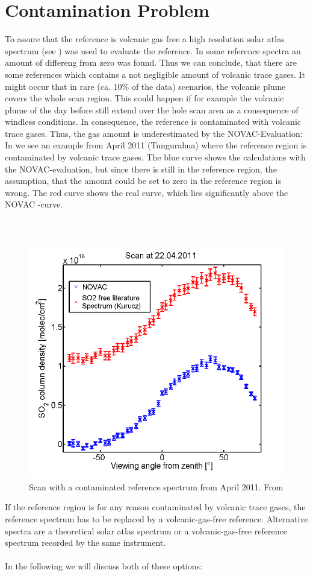 \section{Contamination Problem\label{Chap:Cont}}
To assure that the reference is volcanic gas free a high resolution solar atlas spectrum (see \label{kuruz}) was used to evaluate the reference. In some reference spectra an amount of   differeng from zero was found. Thus we can conclude, that there are some references which contains a not negligible amount of volcanic trace gases.
It might occur that in rare (ca. 10\% of the data) scenarios, the
volcanic plume covers the whole scan region.
This could happen if for example the volcanic plume of the day before still extend over the hole scan area as a consequence of windless conditions.
In consequence, the reference	is contaminated with volcanic trace gases. Thus, the gas amount is underestimated by the NOVAC-Evaluation: In  we see an example from April 2011 (Tungurahua) where the reference region is contaminated by volcanic trace gases. The blue  curve shows the calculations with the NOVAC-evaluation, but since there is still  in the reference region, the assumption, that the  amount could be set to zero in the reference region is wrong. The red curve shows the real  curve, which lies significantly above the NOVAC -curve.\\
\\	
%
\\
\begin{figure}
	\centering
	\includegraphics[width=0.7\linewidth]{Bilder/contaminated}
	\caption{Scan with a contaminated reference spectrum from April 2011. From \cite{WarnachSimon}}
	\label{fig:contaminated}
\end{figure}
If the reference region is for any reason
contaminated by volcanic trace gases, the reference spectrum has to be
replaced by a volcanic-gas-free reference. Alternative spectra are a
theoretical solar atlas spectrum or a volcanic-gas-free reference
spectrum recorded by the same instrument.\\ 
%
\\
%
In the following we will discuss both of these options:
%
